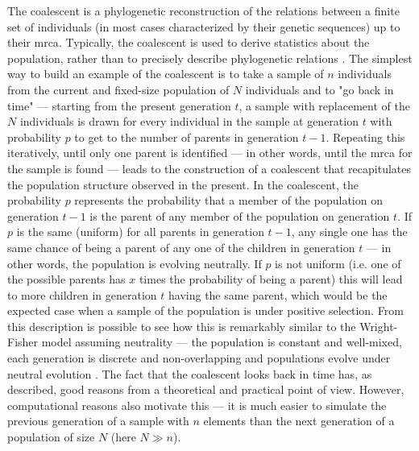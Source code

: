 The coalescent is a phylogenetic reconstruction of the relations between a finite set of individuals (in most cases characterized by their genetic sequences) up to their \ac{mrca}. Typically, the coalescent is used to derive statistics about the population, rather than to precisely describe phylogenetic relations \cite{Gillespie2004-xo}. The simplest way to build an example of the coalescent is to take a sample of $n$ individuals from the current and fixed-size population of $N$ individuals and to "go back in time" --- starting from the present generation $t$, a sample with replacement of the $N$ individuals is drawn for every individual in the sample at generation $t$ with probability $p$ to get to the number of parents in generation $t-1$. Repeating this iteratively, until only one parent is identified --- in other words, until the \ac{mrca} for the sample is found --- leads to the construction of a coalescent that recapitulates the population structure observed in the present. In the coalescent, the probability $p$ represents the probability that a member of the population on generation $t-1$ is the parent of any member of the population on generation $t$.
If $p$ is the same (uniform) for all parents in generation $t-1$, any single one has the same chance of being a parent of any one of the children in generation $t$ --- in other words, the population is evolving neutrally. If $p$ is not uniform (i.e. one of the possible parents has $x$ times the probability of being a parent) this will lead to more children in generation $t$ having the same parent, which would be the expected case when a sample of the population is under positive selection. From this description is possible to see how this is remarkably similar to the Wright-Fisher model assuming neutrality --- the population is constant and well-mixed, each generation is discrete and non-overlapping and populations evolve under neutral evolution \cite{Gillespie2004-xo}. The fact that the coalescent looks back in time has, as described, good reasons from a theoretical and practical point of view. However, computational reasons also motivate this --- it is much easier to simulate the previous generation of a sample with $n$ elements than the next generation of a population of size $N$ (here $N \gg n$).

